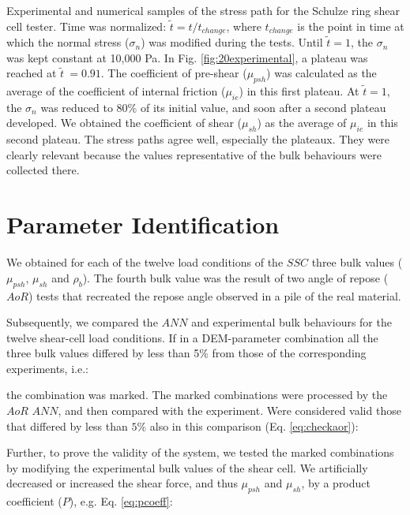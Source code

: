 Experimental and numerical samples of the stress path
    for the Schulze ring shear cell tester.
	Time was normalized: $\tilde{t} = t/t_{change}$, where $t_{change}$ is the
	point in time at which the normal stress ($\sigma_n$) was modified during the
	tests.
	Until $\tilde{t}=1$, the $\sigma_n$ was kept constant at 10,000 Pa. 
	In Fig. \ref{fig:20experimental}, 
 	a plateau was reached at $\tilde{t}~=0.91$.
	The coefficient of pre-shear ($\mu_{psh}$) was calculated as the average of the
	coefficient of internal friction ($\mu_{ie}$) in this first plateau.
	At $\tilde{t}=1$, the $\sigma_n$ was reduced to $80 \%$ of its initial
	value, and soon after
	a second plateau developed.
	We obtained the coefficient of
	shear ($ \mu_{sh}$) as the average of $\mu_{ie}$ in this second plateau.
	The stress paths agree well, especially the plateaux.
	They were clearly relevant because
	the values representative of the bulk behaviours 
	were collected there.










\section{Parameter Identification}
\label{sec:parameteridentification}

We obtained for each of the twelve load conditions of the $SSC$ three bulk
values ($\mu_{psh}$, $\mu_{sh}$ and $\rho_b$).
The fourth bulk value was the result of two angle of repose ($AoR$) tests that
recreated the repose angle observed in a pile of the
real material. 

Subsequently, we compared the $ANN$ and experimental bulk behaviours for the
twelve shear-cell load conditions.
If in a DEM-parameter combination all the three bulk values differed by less 
than 5\% from those of the corresponding experiments, i.e.:

the combination was marked. The marked combinations were processed by the
$AoR$ $ANN$, and then compared with the experiment.
Were considered valid those that differed by less than $5\%$ also in this
comparison (Eq. \ref{eq:checkaor}):

Further, to prove the validity of the system, we tested the marked combinations
by modifying the experimental bulk values of the shear cell. 
We artificially decreased or increased the shear force, and thus $\mu_{psh}$ and
$\mu_{sh}$, by a product coefficient ($P$), e.g. Eq. \ref{eq:pcoeff}:
